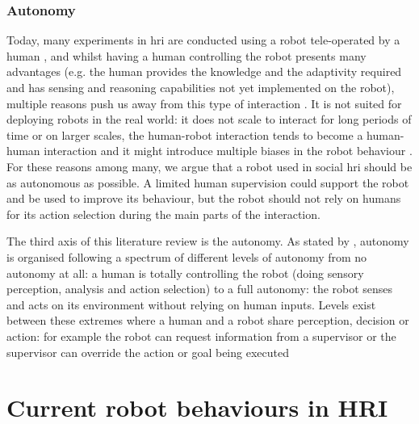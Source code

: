 \subsubsection{Autonomy}
	
	Today, many experiments in \gls{hri} are conducted using a robot tele-operated by a human \citep{baxter2016characterising}, and whilst having a human controlling the robot presents many advantages (e.g. the human provides the knowledge and the adaptivity required and has sensing and reasoning capabilities not yet implemented on the robot), multiple reasons push us away from this type of interaction \citep{Thill2013}. It is not suited for deploying robots in the real world: it does not scale to interact for long periods of time or on larger scales, the human-robot interaction tends to become a human-human interaction \citep{baxter2016characterising} and it might introduce multiple biases in the robot behaviour \citep{howley2014effects}. For these reasons among many, we argue that a robot used in social \gls{hri} should be as autonomous as possible. A limited human supervision could support the robot and be used to improve its behaviour, but the robot should not rely on humans for its action selection during the main parts of the interaction. 
		
    The third axis of this literature review is the autonomy. As stated by \citet{beer2014toward}, autonomy is organised following a spectrum of different levels of autonomy from no autonomy at all: a human is totally controlling the robot (doing sensory perception, analysis and action selection) to a full autonomy: the robot senses and acts on its environment without relying on human inputs. Levels exist between these extremes where a human and a robot share perception, decision or action: for example the robot can request information from a supervisor or the supervisor can override the action or goal being executed
    

\section{Current robot behaviours in HRI} \label{sec:back_behaviour}

